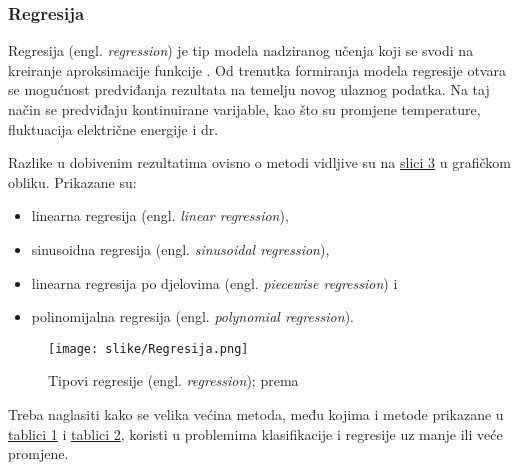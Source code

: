 \documentclass[]{foi} %
\begin{document}
\subsubsection{Regresija}
Regresija  (engl. \textit{regression}) je tip modela nadziranog učenja koji se svodi na kreiranje aproksimacije funkcije \cite{regresijaDef}. Od trenutka formiranja modela regresije otvara se mogućnost predviđanja rezultata na temelju novog ulaznog podatka. Na taj način se predviđaju kontinuirane varijable, kao što su promjene temperature, fluktuacija električne energije i dr.

Razlike u dobivenim rezultatima ovisno o metodi vidljive su na \hyperref[img: slika 3]{slici 3} u grafičkom obliku. Prikazane su:
\begin{itemize}
 \item linearna regresija (engl. \textit{linear regression}),
 \item sinusoidna regresija (engl. \textit{sinusoidal regression}),
 \item linearna regresija po djelovima (engl. \textit{piecewise regression}) i
 \item polinomijalna regresija (engl. \textit{polynomial regression}).
\end{itemize}

\begin{figure}[H]
    \centering
    \texttt{[image: slike/Regresija.png]}
    \caption{Tipovi regresije (engl. \textit{regression}); prema \cite{AIModernApproach}}
\end{figure}
\label{img: slika 3}

Treba naglasiti kako se velika većina metoda, među kojima i metode prikazane u \hyperref[tab:Tablica 1]{tablici 1} i \hyperref[tab:Tablica 2]{tablici 2}, koristi u problemima klasifikacije i regresije uz manje ili veće promjene.
\end{document}
